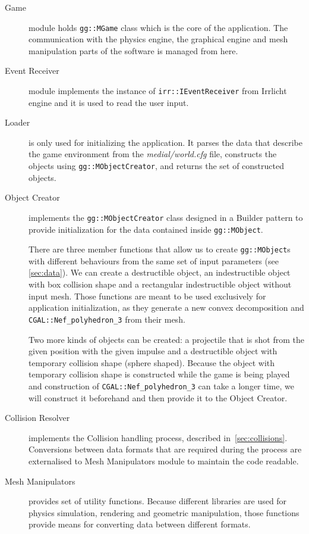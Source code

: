 \begin{description}

\item[Game] module holds {\tt gg::MGame} class which is the core of the application. The communication with the physics engine,  the graphical engine and mesh manipulation parts of the software is managed from here.

\item[Event Receiver] module implements the instance of {\tt irr::IEventReceiver} from Irrlicht engine and it is used to read the user input.

\item[Loader] is only used for initializing the application. It parses the data that describe the game environment from the \emph{medial/world.cfg} file, constructs the objects using {\tt gg::MObjectCreator}, and returns the set of constructed objects.

\item[Object Creator] implements the {\tt gg::MObjectCreator} class designed in a Builder pattern to provide initialization for the data contained inside {\tt gg::MObject}.

There are three member functions that allow us to create {\tt gg::MObject}s  with different behaviours from the same set of input parameters (see \cref{sec:data}). We can create a destructible object, an indestructible object with box collision shape and a rectangular indestructible object without input mesh.  Those functions are meant to be used exclusively for application initialization, as they generate a new convex decomposition and {\tt CGAL::Nef\_polyhedron\_3} from their mesh.

Two more kinds of objects can be created: a projectile that is shot from the given position with the given impulse and a destructible object with temporary collision shape (sphere shaped). Because the object with temporary collision shape is constructed while the game is being played and construction of {\tt CGAL::Nef\_polyhedron\_3} can take a longer time, we will construct it beforehand and then provide it to the Object Creator.

\item[Collision Resolver] implements the Collision handling process, described in~\cref{sec:collisions}. Conversions between data formats that are required during the process are externalised to Mesh Manipulators module to maintain the code readable.

\item[Mesh Manipulators] provides set of utility functions. Because different libraries are used for physics simulation, rendering and geometric manipulation, those functions provide means for converting data between different formats.
\end{description}

